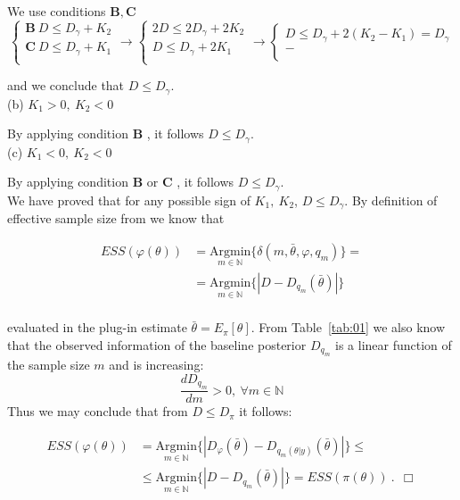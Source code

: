 \documentclass{statsoc}
\begin{document}
\begin{small}
We use conditions $\mathbf{B}, \mathbf{C}$
\begin{equation}
\begin{cases}
\mathbf{B} \ D \le D_{\gamma}+ K_{2}\\
\mathbf{C} \ D \le D_{\gamma}+K_{1}\\
\end{cases} \rightarrow 
\begin{cases}
  2D \le 2D_{\gamma}+ 2K_{2}\\
  D \le D_{\gamma}+2K_{1}\\
\end{cases} \rightarrow
\begin{cases}
  D \le D_{\gamma}+2(K_{2}-K_{1})=D_{\gamma}\\
  -\\
\end{cases}
\label{diseq:system3}
\end{equation}

and we conclude that  $D \le D_{\gamma}$.\\

(b) $ K_{1}>0,\ K_{2}<0$

By applying condition $\mathbf{B}$ , it follows  $D \le D_{\gamma}$.\\

(c) $ K_{1}<0,\ K_{2}<0$

By applying condition $\mathbf{B}$ or $\mathbf{C}$  , it follows  $D \le D_{\gamma}$.\\

We have proved that for any possible sign of $ K_{1}, \ K_{2}$, $D \le D_{\gamma}$. By definition of effective sample size from \cite{morita2008determining} we know that

\begin{align*}
ESS(\varphi(\theta))&=\underset{m \in \mathbb{N}}{\mbox{Argmin}}\{\delta(m, \bar{\theta}, \varphi, q_{m}) \}=\\
&=\underset{m \in \mathbb{N}}{\mbox{Argmin}} \{  | D
-D_{q_{m}}(\bar{\theta})|  \} \\
\end{align*}

evaluated in the plug-in estimate $\bar{\theta}=E_{\pi}[\theta]$. From Table~\ref{tab:01} we also know that the observed information of the baseline posterior $D_{q_{m}}$  is a linear function of the sample size $m$ and is increasing: $$\frac{d D_{q_{m}} }{dm}>0, \ \forall m \in \mathbb{N}$$ Thus we may conclude that from $D \le D_{\pi}$ it follows:

\begin{align*}
 ESS(\varphi(\theta))&= \underset{m \in \mathbb{N}}{\mbox{Argmin}} \{  | D
_{\varphi}(\bar{\theta})
-D_{q_{m}(\theta|y)}(\bar{\theta})|  \} \le \\
&\le  \underset{m \in \mathbb{N}}{\mbox{Argmin}} \{  | D
-D_{q_{m}}(\bar{\theta})|  \} = ESS(\pi(\theta))\ . \ \  \Box
\end{align*}

\end{small}
\end{document}
